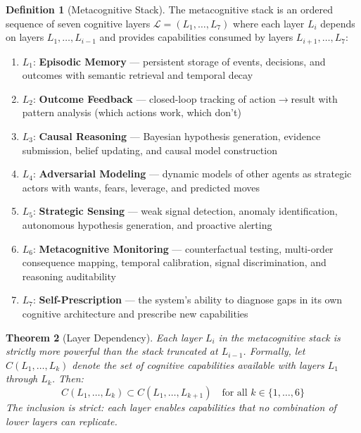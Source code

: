 \documentclass[12pt,a4paper]{article}
\theoremstyle{plain}
\newtheorem{theorem}{Theorem}[section]
\theoremstyle{definition}
\newtheorem{definition}[theorem]{Definition}
\theoremstyle{remark}
\begin{document}
\begin{definition}[Metacognitive Stack]
The metacognitive stack is an ordered sequence of seven cognitive layers $\mathcal{L} = (L_1, \ldots, L_7)$ where each layer $L_i$ depends on layers $L_1, \ldots, L_{i-1}$ and provides capabilities consumed by layers $L_{i+1}, \ldots, L_7$:

\begin{enumerate}[nosep]
\item $L_1$: \textbf{Episodic Memory} --- persistent storage of events, decisions, and outcomes with semantic retrieval and temporal decay
\item $L_2$: \textbf{Outcome Feedback} --- closed-loop tracking of action$\to$result with pattern analysis (which actions work, which don't)
\item $L_3$: \textbf{Causal Reasoning} --- Bayesian hypothesis generation, evidence submission, belief updating, and causal model construction
\item $L_4$: \textbf{Adversarial Modeling} --- dynamic models of other agents as strategic actors with wants, fears, leverage, and predicted moves
\item $L_5$: \textbf{Strategic Sensing} --- weak signal detection, anomaly identification, autonomous hypothesis generation, and proactive alerting
\item $L_6$: \textbf{Metacognitive Monitoring} --- counterfactual testing, multi-order consequence mapping, temporal calibration, signal discrimination, and reasoning auditability
\item $L_7$: \textbf{Self-Prescription} --- the system's ability to diagnose gaps in its own cognitive architecture and prescribe new capabilities
\end{enumerate}
\end{definition}

\begin{theorem}[Layer Dependency]
Each layer $L_i$ in the metacognitive stack is strictly more powerful than the stack truncated at $L_{i-1}$. Formally, let $C(L_1, \ldots, L_k)$ denote the set of cognitive capabilities available with layers $L_1$ through $L_k$. Then:
\[
C(L_1, \ldots, L_k) \subset C(L_1, \ldots, L_{k+1}) \quad \text{for all } k \in \{1, \ldots, 6\}
\]
The inclusion is strict: each layer enables capabilities that no combination of lower layers can replicate.
\end{theorem}
\end{document}
